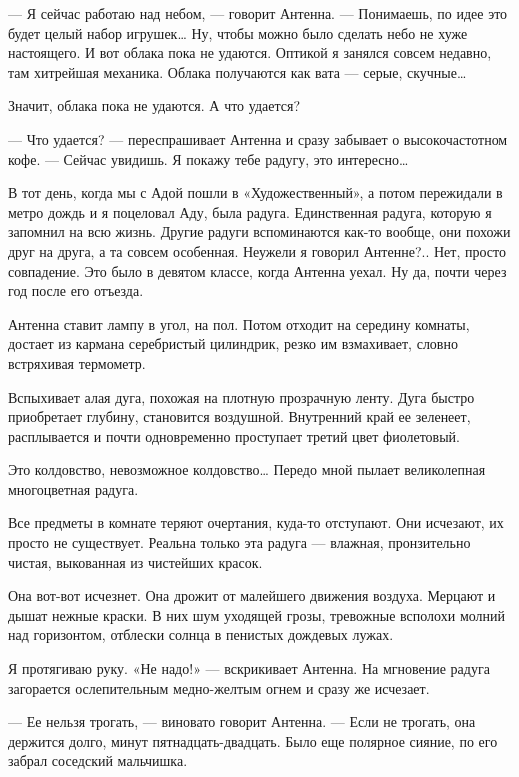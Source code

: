    — Я сейчас работаю над небом, — говорит Антенна. — Понимаешь, по идее  это
   будет целый  набор игрушек…  Ну, чтобы  можно было  сделать небо  не  хуже
   настоящего. И  вот  облака  пока  не удаются.  Оптикой  я  занялся  совсем
   недавно, там  хитрейшая  механика. Облака  получаются  как вата  —  серые,
   скучные…

   Значит, облака пока не удаются. А что удается?

   — Что удается? — переспрашивает Антенна и сразу забывает о высокочастотном
   кофе. — Сейчас увидишь. Я покажу тебе радугу, это интересно…

   В тот день, когда мы с Адой пошли в «Художественный», а потом пережидали в
   метро дождь и я поцеловал Аду, была радуга. Единственная радуга, которую я
   запомнил на  всю  жизнь. Другие  радуги  вспоминаются как-то  вообще,  они
   похожи друг на друга, а та совсем особенная. Неужели я говорил  Антенне?..
   Нет, просто совпадение. Это было в девятом классе, когда Антенна уехал. Ну
   да, почти через год после его отъезда.

   Антенна ставит лампу в  угол, на пол. Потом  отходит на середину  комнаты,
   достает из  кармана серебристый  цилиндрик,  резко им  взмахивает,  словно
   встряхивая термометр.

   Вспыхивает алая дуга,  похожая на  плотную прозрачную  ленту. Дуга  быстро
   приобретает глубину, становится  воздушной. Внутренний  край ее  зеленеет,
   расплывается и почти одновременно проступает третий цвет фиолетовый.

   Это колдовство, невозможное  колдовство… Передо  мной пылает  великолепная
   многоцветная радуга.

   Все предметы в комнате теряют очертания, куда-то отступают. Они  исчезают,
   их просто не существует. Реальна только эта радуга — влажная, пронзительно
   чистая, выкованная из чистейших красок.

   Она вот-вот исчезнет. Она дрожит от малейшего движения воздуха. Мерцают  и
   дышат нежные краски. В них  шум уходящей грозы, тревожные всполохи  молний
   над горизонтом, отблески солнца в пенистых дождевых лужах.

   Я протягиваю руку. «Не надо!»  — вскрикивает Антенна. На мгновение  радуга
   загорается ослепительным медно-желтым огнем и сразу же исчезает.

   — Ее нельзя трогать,  — виновато говорит Антенна.  — Если не трогать,  она
   держится долго, минут  пятнадцать-двадцать. Было еще  полярное сияние,  по
   его забрал соседский мальчишка.

